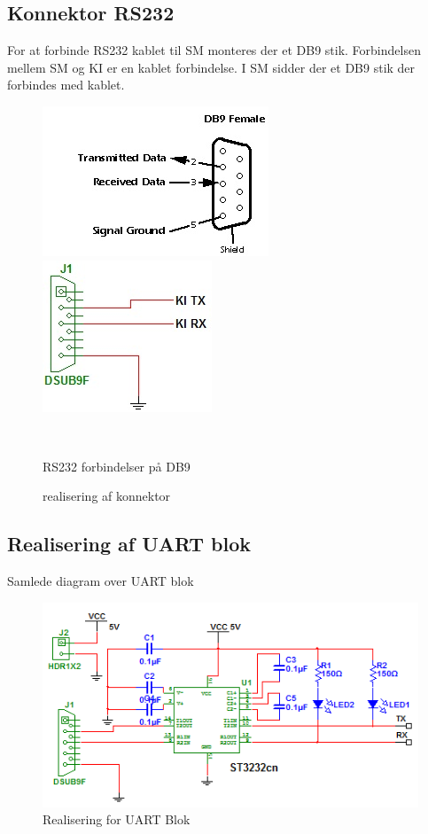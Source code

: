 \subsection{Konnektor RS232}
For at forbinde RS232 kablet til SM monteres der et DB9 stik. Forbindelsen mellem SM og KI er en kablet forbindelse. I SM sidder der et DB9 stik der forbindes med kablet.
\begin{figure}[htbp] \centering
\begin{minipage}[c]{0.48\textwidth} \centering
\includegraphics[scale=1]{billeder/konnektor.jpg} 
\end{minipage} \hfill
\begin{minipage}[c]{0.48\textwidth} \centering
\includegraphics[scale=1]{billeder/konnektor_dia.jpg} 
\end{minipage} \\ 
\begin{minipage}[b]{0.48\textwidth}
\caption{RS232 forbindelser på DB9} 
\label{fig:Blokdiagram_12V}
\end{minipage} \hfill
\begin{minipage}[b]{0.48\textwidth}
\caption{realisering af konnektor} 
\label{fig:Konnektor}
\end{minipage}
\end{figure}
\newpage
\subsection{Realisering af UART blok}
Samlede diagram over UART blok
\begin{figure}[H]
\centering
\includegraphics[scale=1]{billeder/HWUART}
\caption{Realisering for UART Blok}
\label{fig:SMHWUARTB}
\end{figure}
